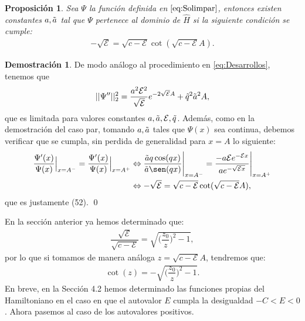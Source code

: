 \documentclass[12pt]{article}
\newtheorem{prop}[teo]{Proposición}
\theoremstyle{definition}
\newtheorem*{demo}{Demostración}
\begin{document}
\begin{prop}
    Sea $\Psi$ la función definida en $\eqref{eq:Solimpar}$, entonces existen constantes $a,\Tilde{a}$ tal que $\Psi$ pertenece al dominio de $\hat{H}$ si la siguiente condición se cumple:
    \begin{align*}  -\sqrt{\mathcal{E}} = \sqrt{c-\mathcal{E}}\cot(\sqrt{c-\mathcal{E}}A).
    \end{align*}
\end{prop}
\begin{demo}
    De modo análogo al procedimiento en \eqref{eq:Desarrollos}, tenemos que
    \begin{align*}
        ||\Psi''||_{2}^{2} = \frac{a^2\mathcal{E}^2}{\sqrt{\mathcal{E}}}e^{-2\sqrt{\mathcal{E}}A}+\Tilde{q}^2\Tilde{a}^2A,
    \end{align*}
    que es limitada para valores constantes $a,\Tilde{a},\mathcal{E},\Tilde{q}$.
    Además, como en la demostración del caso par, tomando $a,\Tilde{a}$ tales que $\Psi(x)$ sea continua, debemos verificar que se cumpla, sin perdida de generalidad para $x = A$ lo siguiente:
    \begin{align*}
    \frac{\Psi'(x)}{\Psi(x)}\Big|_{x=A^{-}} =
    \frac{\Psi'(x)}{\Psi(x)}\Big|_{x=A^{+}}
         &
        \Leftrightarrow \frac{\Tilde{a}q\cos(qx)}{\Tilde{a}\sen(qx)}\Bigg|_{x=A^{-}} 
         =
         \frac{-a\mathcal{E}e^{-\mathcal{E}x}}{ae^{-\sqrt{\mathcal{E}x}}}\Bigg|_{x=A^+} 
         \\
          & \Leftrightarrow
          -\sqrt{\mathcal{E}} = \sqrt{c-\mathcal{E}}\cot(\sqrt{c-\mathcal{E}}A),
    \end{align*}
    que es justamente (52).
    \qed 
\end{demo}
\noindent
En la sección anterior ya hemos determinado que:
\begin{align*}
    \dfrac{\sqrt{\mathcal{E}}}{\sqrt{c-\mathcal{E}}} = \sqrt{\bigg(\dfrac{z_{0}}{z}\bigg)^2-1},
\end{align*}
por lo que si tomamos de manera análoga $z = \sqrt{c-\mathcal{E}}A$, tendremos que:
\begin{align*}
    \cot(z) = - \sqrt{\bigg(\dfrac{z_{0}}{z}\bigg)^2-1}.
\end{align*}
En breve, en la Sección 4.2 hemos determinado las funciones propias del Hamiltoniano en el caso en que el autovalor $E$ cumpla la desigualdad $-C<E<0$. Ahora pasemos al caso de los autovalores positivos. 
\end{document}
